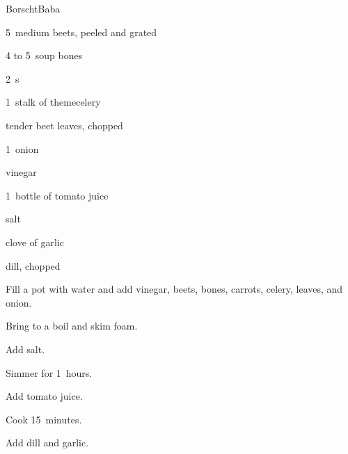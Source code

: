 \begin{recipe}{Borscht}{Baba}{}

\begin{ingredients}
\item 5~medium beets, peeled and grated
\item 4 to 5~soup bones
\item 2~s
\item 1~stalk of theme{celery}
\item tender beet leaves, chopped
\item 1~onion
\item {} vinegar
\item 1~bottle of tomato juice
\item {} salt
\item clove of garlic
\item dill, chopped
\end{ingredients}

\begin{directions}
\item Fill a pot with water and add vinegar, beets, bones, carrots, celery, leaves, and onion.
\item Bring to a boil and skim foam.
\item Add salt.
\item Simmer for 1\half~hours.
\item Add tomato juice.
\item Cook 15~minutes.
\item Add dill and garlic.
\end{directions}

\end{recipe}

